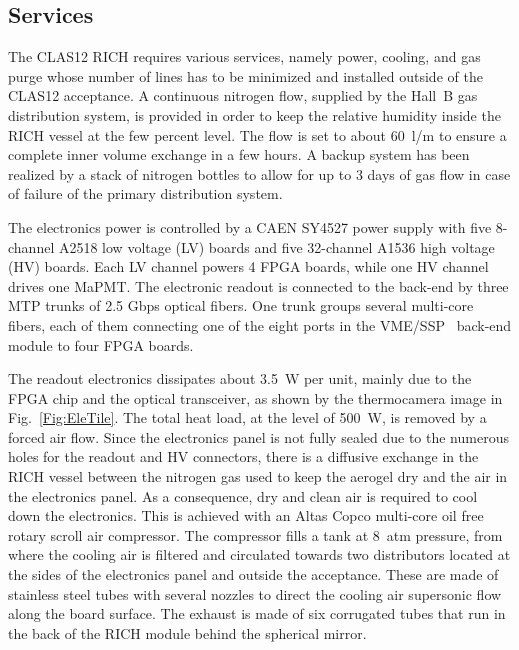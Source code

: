 \documentclass[5p,times,twocolumn]{elsarticle}
\begin{document}
\subsection{Services}

The CLAS12 RICH requires various services, namely power, cooling, and gas purge whose number of lines has to be
minimized and installed outside of the CLAS12 acceptance. A continuous nitrogen flow, supplied by the Hall~B gas
distribution system, is provided in order to keep the relative humidity inside the RICH vessel at the few percent
level. The flow is set to about 60~l/m to ensure a complete inner volume exchange in a few hours. 
A backup system has been realized by a stack of nitrogen bottles to allow for up to 3 days of gas flow in case of
failure of the primary distribution system.

The electronics power is controlled by a CAEN SY4527 power supply with five 8-channel A2518 low voltage (LV) boards and five
32-channel A1536 high voltage (HV) boards. Each LV channel powers 4 FPGA boards, while one HV channel drives one MaPMT. The
electronic readout is connected to the back-end by three MTP trunks of 2.5 Gbps optical fibers. One trunk groups
several multi-core fibers, each of them connecting one of the eight ports in the VME/SSP~\cite{daq-nim} back-end
module to four FPGA boards.

The readout electronics dissipates about 3.5~W per unit, mainly due to the FPGA chip and the optical transceiver, as
shown by the thermocamera image in Fig.~\ref{Fig:EleTile}. The total heat load, at the level of 500~W, is removed by
a forced air flow. Since the electronics panel is not fully sealed due to the numerous holes for the readout and HV
connectors, there is a diffusive exchange in the RICH vessel between the nitrogen gas used to keep the aerogel dry
and the air in the electronics panel. As a consequence, dry and clean air is required to cool down the electronics. This
is achieved with an Altas Copco multi-core oil free rotary scroll air compressor. The compressor fills a tank at 8~atm
pressure, from where the cooling air is filtered and circulated towards two distributors located at the sides of the
electronics panel and outside the acceptance. These are made of stainless steel tubes with several nozzles to direct
the cooling air supersonic flow along the board surface. The exhaust is made of six corrugated tubes that run in the
back of the RICH module behind the spherical mirror.
\end{document}
